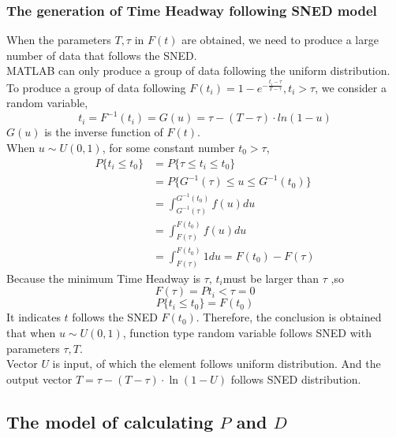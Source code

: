 \documentclass[UTF8]{mcmthesis}
\begin{document}
\subsubsection{The generation of Time Headway following SNED model}
\indent When the parameters $T, \tau $ in $F(t)$ are obtained, we need to produce a large number of data that follows the SNED.\\
\indent MATLAB can only produce a group of data following the uniform distribution. To produce a group of data following $ F(t_{i})=1-e^{-\frac{t_{i}-\tau}{T-\tau}},t_{i}>\tau $, we consider a random variable, 
\begin{equation}
	t_{i}=F^{-1}(t_{i})=G(u)=\tau-(T-\tau)\cdot ln(1-u)
\end{equation}
\indent $G(u)$ is the inverse function of $F(t)$.\\
\indent When $ u \sim U(0,1) $, for some constant number $t_{0}>\tau$,\\
\begin{equation}
\begin{split}
	P\{t_{i}\leqslant t_{0}\}&=P\{\tau\leqslant t_{i} \leqslant t_{0} \}\\
&=P\{ G^{-1}(\tau)\leqslant u \leqslant G^{-1}(t_{0})\}\\
&=\int_{G^{-1}(\tau)}^{G^{-1}(t_{0})}f(u)du\\
&=\int_{F(\tau)}^{F(t_{0})}f(u)du\\
&=\int_{F(\tau)}^{F(t_{0})}1du=F(t_{0})-F(\tau)
\end{split}
\end{equation}
\indent Because the minimum Time Headway is $\tau$, $ t_{i} $must be larger than $\tau$ ,so\\
\begin{equation}
	F(\tau)=P{t_{i}<\tau}=0
\end{equation}
\begin{equation}
	P\{t_{i} \leqslant t_{0} \}=F(t_{0})
\end{equation}
\indent It indicates $t$ follows the SNED $F(t_{0})$. Therefore, the conclusion is obtained that when $ u \sim U(0,1) $, function type random variable follows SNED with parameters $\tau , T $. \\
\indent Vector $U$ is input, of which the element follows uniform distribution. And the output vector $T=\tau-(T-\tau)\cdot \ln(1-U)$ follows SNED distribution.


\subsection{The model of calculating $P$ and $D$}
\end{document}
